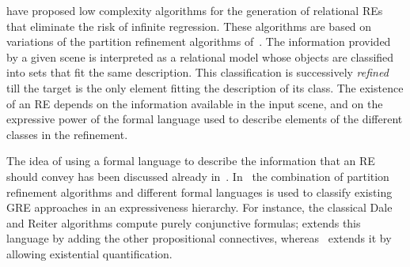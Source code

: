  have proposed low complexity algorithms for the generation 
of relational REs 
that eliminate the risk of infinite regression. 
These algorithms are based on variations of the partition refinement algorithms of~.
The information provided by a given scene is interpreted as a relational model whose 
objects are classified into sets that fit the same description.  
This classification is successively \emph{refined}  till the target 
is the only element fitting the description of its class.  The existence of an RE 
depends on the information available in the input scene, and on the expressive power of the formal 
language used to describe elements of the different classes in the refinement. 

The idea of using a formal language to describe the information that an RE should convey has been discussed 
already in~\cite{Krahmer2003,gardent07:_gener_bridg_defin_descr}.  In~\cite{arec2:2008:Areces,arec:usin11} the 
combination of partition refinement algorithms and different formal languages is used to classify existing 
GRE approaches in an expressiveness hierarchy.  For instance, the classical Dale and Reiter algorithms
compute purely conjunctive formulas; \cite{deemter02:_gener_refer_expres} extends this language by
adding the other propositional connectives, whereas~\cite{dale91:_gener_refer_expres_invol_relat} extends it by
allowing existential quantification.

